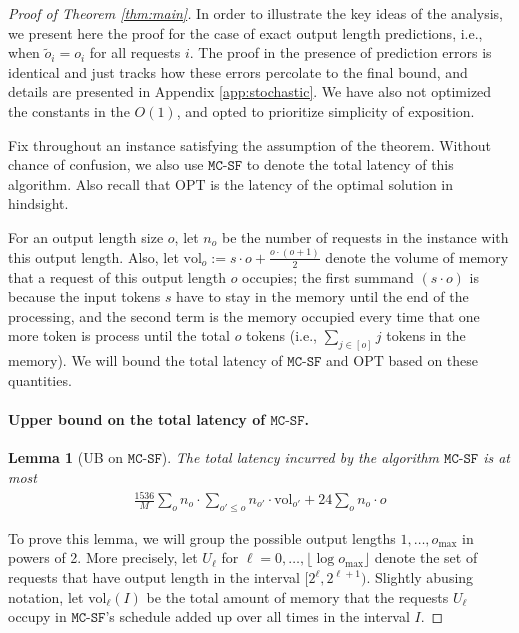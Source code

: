 \documentclass[11pt, a4paper]{article}
\theoremstyle{plain}
\newtheorem{lemma}[theorem]{Lemma}
\theoremstyle{definition}
\theoremstyle{remark}
\newcommand{\OPT}{\text{OPT}}
\newcommand{\mcsdf}{\texttt{MC-SF}}
\newcommand{\vol}{\textrm{vol}}
\newcommand{\alg}{\mcsdf}
\newcommand{\po}{\tilde{o}}
\begin{document}
\begin{proof}[Proof of Theorem \ref{thm:main}]
In order to illustrate the key ideas of the analysis, we present here the proof for the case of exact output length predictions, i.e., when $\po_i = o_i$ for all requests $i$. The proof in the presence of prediction errors is identical and just tracks how these errors percolate to the final bound, and details are presented in Appendix \ref{app:stochastic}. We have also not optimized the constants in the $O(1)$, and opted to prioritize simplicity of exposition. 



Fix throughout an instance satisfying the assumption of the theorem. Without chance of confusion, we also use $\mcsdf$ to denote the total latency of this algorithm. Also recall that $\OPT$ is the latency of the optimal solution in hindsight. 

For an output length size $o$, let $n_o$ be the number of requests in the instance with this output length. Also, let $\vol_o := s \cdot o + \frac{o \cdot (o+1)}{2}$ denote the volume of memory that a request of this output length $o$ occupies; the first summand $(s \cdot o)$ is because the input tokens $s$ have to stay in the memory until the end of the processing, and the second term is the memory occupied every time that one more token is process until the total $o$ tokens (i.e., $\sum_{j \in [o]} j$ tokens in the memory). We will bound the total latency of $\alg$ and $\OPT$ based on these quantities. 




\paragraph{Upper bound on the total latency of $\alg$.}

\begin{lemma}[UB on $\alg$] \label{lemma:UBAlg}
	The total latency incurred by the algorithm $\alg$ is at most
	\begin{align*}
		\frac{1536}{M} \sum_o n_o \cdot \sum_{o' \le o} n_{o'} \cdot  \vol_{o'} + 24 \sum_o n_o \cdot o
	\end{align*}
\end{lemma}

To prove this lemma, we will group the possible output lengths $1,\ldots, o_{\max}$ in powers of 2. More precisely, let $U_\ell$ for $\ell = 0,\ldots, \lfloor \log o_{\max} \rfloor$ denote the set of requests that have output length in the interval $[2^\ell, 2^{\ell + 1})$. Slightly abusing notation, let $\vol_\ell(I)$  be the total amount of memory that the requests $U_\ell$ occupy in $\alg$'s schedule added up over all times in the interval $I$. 



\end{proof}
\end{document}
